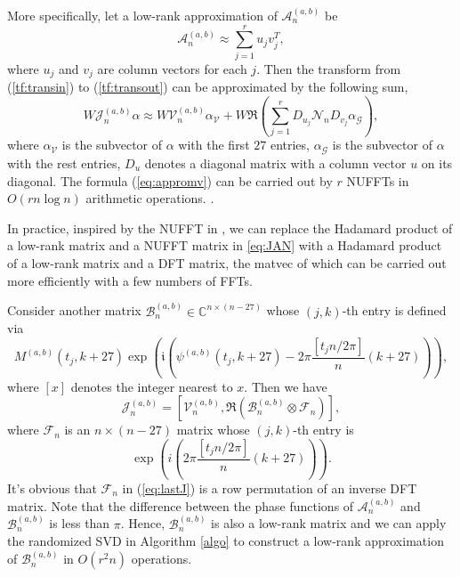 \documentclass[11pt]{article}
\newcommand{\ii}{\mathfrak{i}}
\begin{document}
More specifically, let a low-rank approximation of $\mathcal{A}_{n}^{(a,b)}$ be
\begin{equation}
\label{eq:approA}
\mathcal{A}_{n}^{(a,b)} \approx \sum\limits_{j=1}^{r}u_{j}v_{j}^{T},
\end{equation}
where $u_{j}$ and $v_{j}$ are column vectors for each $j$. 
Then the transform from (\ref{tf:transin}) to (\ref{tf:transout}) can be approximated by the following sum,
\begin{equation}
\label{eq:appromv}
W\mathcal{J}_{n}^{(a,b)}\alpha  \approx W\mathcal{V}_n^{(a,b)} \alpha_{\mathcal{V}} + W\Re(\sum\limits_{j=1}^{r}D_{u_{j}}\mathcal{N}_{n}D_{v_{j}}\alpha_{\mathcal{G}}),
\end{equation}
where $\alpha_{\mathcal{V}}$ is the subvector of $\alpha$ with the first $27$ entries, $\alpha_{\mathcal{G}}$ is the subvector of $\alpha$ with the rest entries, $D_{u}$ denotes a diagonal matrix with a column vector $u$ on its diagonal. The formula (\ref{eq:appromv}) 
 can be carried out by $r$ NUFFTs in $O(rn\log n)$ arithmetic operations. {}.



In practice, inspired by the NUFFT in \cite{Townsend}, we can replace the Hadamard product of a low-rank matrix and a NUFFT matrix in \eqref{eq:JAN} with a Hadamard product of a low-rank matrix and a DFT matrix, the matvec of which can be carried out more efficiently with a few numbers of FFTs.

 

Consider another matrix $\mathcal{B}_{n}^{(a,b)}\in\mathbb{C}^{n \times (n-27)}$ whose $(j,k)$-th entry is defined via 
\begin{equation}
\label{eq:B}
M^{(a,b)}\left(t_{j},k+27\right)\exp\left(\ii(\psi^{(a,b)}(t_{j},k+27)-2\pi\dfrac{[t_{j}n/2\pi]}{n}(k+27))\right),
\end{equation}
where $[x]$ denotes the integer nearest to $x$. Then we have
\begin{equation}
\label{eq:lastJ}
\mathcal{J}_{n}^{(a,b)} =  \left[ \mathcal{V}_n^{(a,b)},\Re{(\mathcal{B}_{n}^{(a,b)}\otimes \mathcal{F}_{n})}\right],
\end{equation}
where $\mathcal{F}_{n}$ is an $n\times (n-27)$ matrix whose $(j,k)$-th entry is
\begin{equation}
\label{eq:permuDFT}
\exp\left(i(2\pi\dfrac{[t_{j}n/2\pi]}{n}(k+27))\right).
\end{equation}
It's obvious that $\mathcal{F}_{n}$ in (\ref{eq:lastJ}) 
is a row permutation of an inverse DFT matrix. 
Note that the difference between the phase functions of $\mathcal{A}_{n}^{(a,b)}$ and $\mathcal{B}_{n}^{(a,b)}$ is less than $\pi$. Hence, $\mathcal{B}_{n}^{(a,b)}$ is also a low-rank matrix and we can apply the randomized SVD in Algorithm \ref{algo} to construct a low-rank approximation of $\mathcal{B}_{n}^{(a,b)}$ in $O(r^2n)$ operations. 
\end{document}
